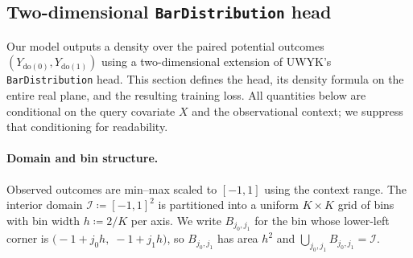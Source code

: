 \subsection{Two-dimensional \texttt{BarDistribution} head}
\label{sec:2d-bardistribution}

Our model outputs a density over the paired potential outcomes
$(Y_{\mathrm{do}(0)}, Y_{\mathrm{do}(1)})$ using a two-dimensional
extension of UWYK's \texttt{BarDistribution} head. This section defines
the head, its density formula on the entire real plane, and the resulting
training loss. All quantities below are conditional on the query
covariate $X$ and the observational context; we suppress that
conditioning for readability.

\paragraph{Domain and bin structure.}
Observed outcomes are min--max scaled to $[-1,1]$ using the context
range. The interior domain $\mathcal{I} \coloneqq [-1,1]^{2}$ is
partitioned into a uniform $K \times K$ grid of bins with bin width
$h \coloneqq 2/K$ per axis. We write
$B_{j_0, j_1}$ for the bin whose lower-left corner is
$\bigl(-1 + j_0 h,\; -1 + j_1 h\bigr)$, so
$B_{j_0,j_1}$ has area $h^{2}$ and
$\bigcup_{j_0, j_1} B_{j_0, j_1} = \mathcal{I}$.

